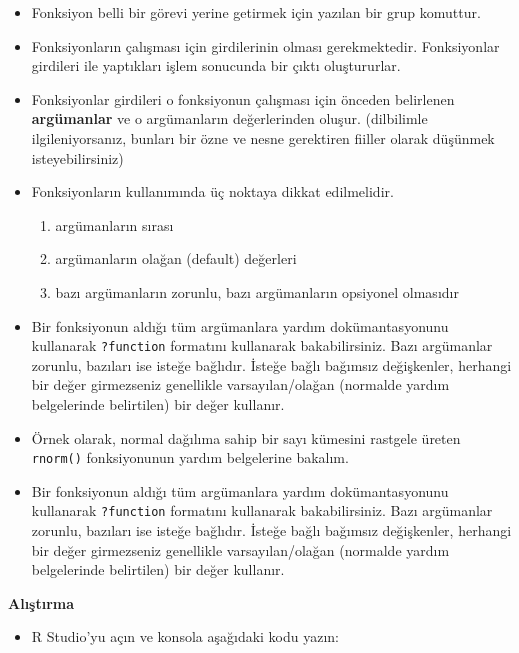 \documentclass[
  oneside]{book}
\providecommand{\tightlist}{%
  \setlength{\itemsep}{0pt}\setlength{\parskip}{0pt}}
\begin{document}
\begin{itemize}
\item
  Fonksiyon belli bir görevi yerine getirmek için yazılan bir grup komuttur.
\item
  Fonksiyonların çalışması için girdilerinin olması gerekmektedir. Fonksiyonlar girdileri ile yaptıkları işlem sonucunda bir çıktı oluştururlar.
\item
  Fonksiyonlar girdileri o fonksiyonun çalışması için önceden belirlenen \textbf{argümanlar} ve o argümanların değerlerinden oluşur. (dilbilimle ilgileniyorsanız, bunları bir özne ve nesne gerektiren fiiller olarak düşünmek isteyebilirsiniz)
\item
  Fonksiyonların kullanımında üç noktaya dikkat edilmelidir.

  \begin{enumerate}
  \def\labelenumi{\arabic{enumi}.}
  \tightlist
  \item
    argümanların sırası
  \item
    argümanların olağan (default) değerleri
  \item
    bazı argümanların zorunlu, bazı argümanların opsiyonel olmasıdır
  \end{enumerate}
\item
  Bir fonksiyonun aldığı tüm argümanlara yardım dokümantasyonunu kullanarak \texttt{?function} formatını kullanarak bakabilirsiniz. Bazı argümanlar zorunlu, bazıları ise isteğe bağlıdır. İsteğe bağlı bağımsız değişkenler, herhangi bir değer girmezseniz genellikle varsayılan/olağan (normalde yardım belgelerinde belirtilen) bir değer kullanır.
\item
  Örnek olarak, normal dağılıma sahip bir sayı kümesini rastgele üreten \texttt{rnorm()} fonksiyonunun yardım belgelerine bakalım.
\item
  Bir fonksiyonun aldığı tüm argümanlara yardım dokümantasyonunu kullanarak \texttt{?function} formatını kullanarak bakabilirsiniz. Bazı argümanlar zorunlu, bazıları ise isteğe bağlıdır. İsteğe bağlı bağımsız değişkenler, herhangi bir değer girmezseniz genellikle varsayılan/olağan (normalde yardım belgelerinde belirtilen) bir değer kullanır.
\end{itemize}

\textbf{Alıştırma }

\begin{itemize}
\tightlist
\item
  R Studio'yu açın ve konsola aşağıdaki kodu yazın:
\end{itemize}
\end{document}
